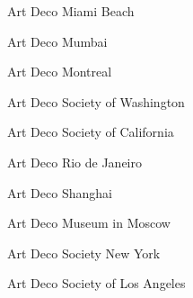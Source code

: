 Art Deco Miami Beach

Art Deco Mumbai

Art Deco Montreal

Art Deco Society of Washington

Art Deco Society of California

Art Deco Rio de Janeiro

Art Deco Shanghai

Art Deco Museum in Moscow

Art Deco Society New York

Art Deco Society of Los Angeles
